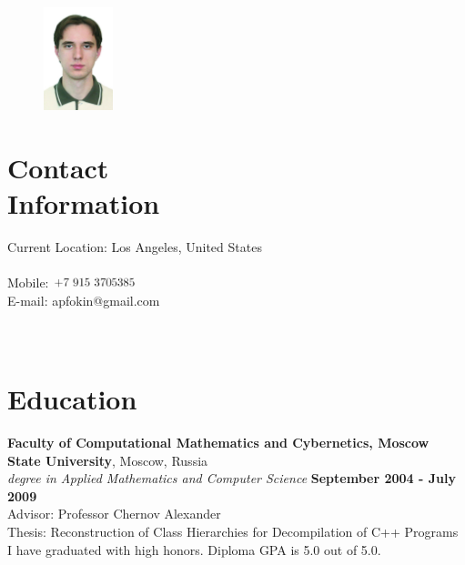 \documentclass[margin,line]{CV}
\begin{document}
\begin{resume}

\begin{figure}
    \vspace{-20pt}
    \includegraphics[width=2cm]{photo.jpg}
    \vspace{-20pt}
\end{figure}

    \section{\mysidestyle Contact\\Information}
    Current Location: Los Angeles, United States \\
    \\
    Mobile: \includegraphics[height=0.35cm]{phone.png} \\ 
    E-mail: apfokin@gmail.com \\
    \\
    \\

    \section{\mysidestyle Education}
    \textbf{Faculty of Computational Mathematics and Cybernetics, Moscow State University}, Moscow, Russia \vspace{2mm}\\\vspace{1mm}%
    \textsl{ degree in Applied Mathematics and Computer Science} \hfill \textbf{September 2004 - July 2009}\vspace{1mm}\\
    Advisor: Professor Chernov Alexander \\
    Thesis: Reconstruction of Class Hierarchies for Decompilation of C++ Programs \\
    I have graduated with high honors. Diploma GPA is 5.0 out of 5.0.


\end{resume}
\end{document}
